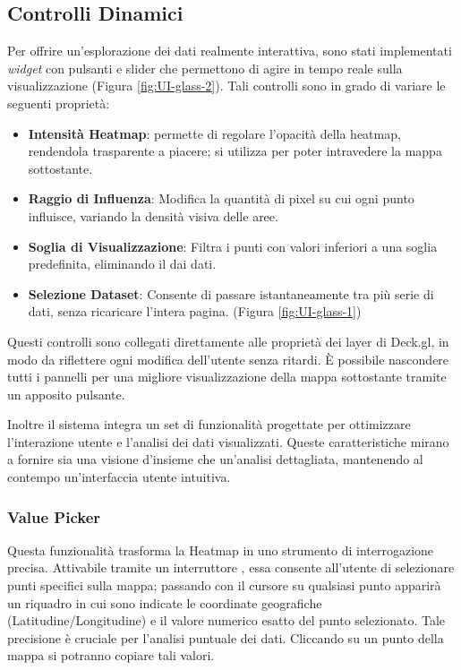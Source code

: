 \subsection{Controlli Dinamici}

Per offrire un'esplorazione dei dati realmente interattiva, sono stati implementati \textit{widget} con pulsanti e slider che permettono di agire in tempo reale sulla visualizzazione (Figura \ref{fig:UI-glass-2}). Tali controlli sono in grado di variare le seguenti proprietà:

\begin{itemize}
  \item \textbf{Intensità Heatmap}: permette di regolare l'opacità della heatmap, rendendola trasparente a piacere; si utilizza per poter intravedere la mappa sottostante.
  \item \textbf{Raggio di Influenza}: Modifica la quantità di pixel su cui ogni punto influisce, variando la densità visiva delle aree.
  \item \textbf{Soglia di Visualizzazione}: Filtra i punti con valori inferiori a una soglia predefinita, eliminando il  dai dati.
  \item \textbf{Selezione Dataset}: Consente di passare istantaneamente tra più serie di dati, senza ricaricare l'intera pagina. (Figura \ref{fig:UI-glass-1})
\end{itemize}

Questi controlli sono collegati direttamente alle proprietà dei layer di Deck.gl, in modo da riflettere ogni modifica dell'utente senza ritardi. 
È possibile nascondere tutti i pannelli per una migliore visualizzazione della mappa sottostante tramite un apposito pulsante.

Inoltre il sistema integra un set di funzionalità progettate per ottimizzare l'interazione utente e l'analisi dei dati visualizzati. Queste caratteristiche mirano a fornire sia una visione d'insieme che un'analisi dettagliata, mantenendo al contempo un'interfaccia utente intuitiva.

\subsubsection*{Value Picker} Questa funzionalità trasforma la Heatmap in uno strumento di interrogazione precisa. Attivabile tramite un interruttore , essa consente all'utente di selezionare punti specifici sulla mappa; passando con il cursore su qualsiasi punto apparirà un riquadro in cui sono indicate le coordinate geografiche (Latitudine/Longitudine) e il valore numerico esatto del punto selezionato. Tale precisione è cruciale per l'analisi puntuale dei dati. Cliccando su un punto della mappa si potranno copiare tali valori.

